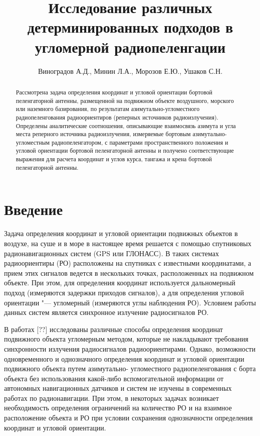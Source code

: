 \documentclass[a4paper,12pt]{article}
\author{Виноградов А.Д., Минин Л.А., Морозов Е.Ю., Ушаков С.Н.}
\title{Исследование различных детерминированных подходов в угломерной радиопеленгации}
\date{}
\begin{document}
\maketitle

\begin{abstract}
Рассмотрена задача определения координат и угловой ориентации бортовой пеленгаторной антенны,
размещенной на подвижном объекте воздушного, морского или наземного базирования, по результатам
азимутально-угломестного радиопеленгования радиоориентиров (реперных источников радиоизлучения).
Определены аналитические соотношения, описывающие взаимосвязь азимута и угла места реперного
источника радиоизлучения, измеряемые бортовым азимутально-угломестным радиопеленгатором,
с параметрами пространственного положения и угловой ориентации бортовой пеленгаторной антенны
и получено соответствующие выражения для расчета координат и углов курса, тангажа и крена бортовой
пеленгаторной антенны.
\end{abstract}

\section*{Введение}
Задача определения координат и угловой ориентации подвижных объектов в воздухе, на суше и в море
в настоящее время решается с помощью спутниковых радионавигационных систем (GPS или ГЛОНАСС). В таких
системах радиоориентиры (РО) расположены на спутниках с известными координатами, а прием этих сигналов
ведется в нескольких точках, расположенных на подвижном объекте. При этом, для определения координат
используется дальномерный подход (измеряются задержки приходов сигналов), а для определения угловой
ориентации "--- угломерный (измеряются углы наблюдения РО). Условием работы данных систем является
синхронное излучение радиосигналов РО.

В работах [??] исследованы различные способы определения координат подвижного объекта угломерным методом,
которые не накладывают требования синхронности излучения радиосигналов радиоориентирами. Однако, возможности
одновременного и однозначного определения координат и угловой ориентации подвижного объекта путем азимутально-
угломестного радиопеленгования с борта объекта без использования какой-либо вспомогательной информации
от автономных навигационных датчиков и систем не изучены в современных работах по радионавигации. При этом,
в некоторых задачах возникает необходимость определения ограничений на количество РО и на взаимное расположение
объекта и РО при условии сохранения однозначности определения координат и угловой ориентации.
\end{document}
